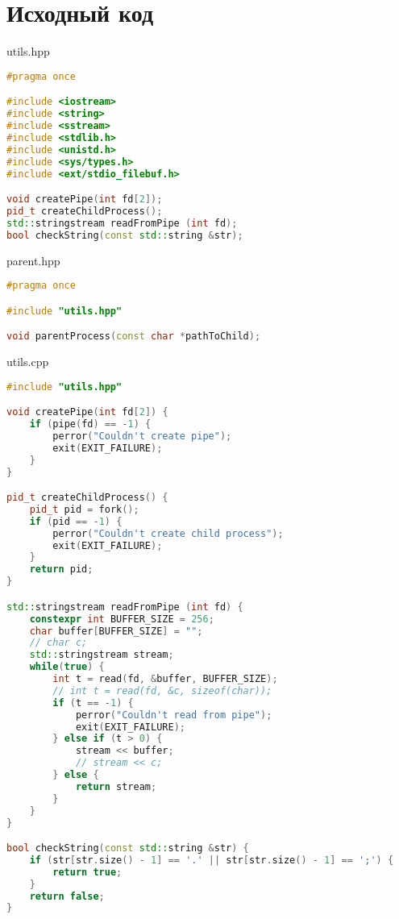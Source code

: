 \documentclass[a4paper, 12pt]{article}
\begin{document}
\newpage

\section{Исходный код}
utils.hpp
\begin{lstlisting}[language=C++]
#pragma once

#include <iostream>
#include <string>
#include <sstream>
#include <stdlib.h>
#include <unistd.h>
#include <sys/types.h>
#include <ext/stdio_filebuf.h>

void createPipe(int fd[2]);
pid_t createChildProcess();
std::stringstream readFromPipe (int fd);
bool checkString(const std::string &str);
\end{lstlisting}

parent.hpp
\begin{lstlisting}[language=C++]
#pragma once

#include "utils.hpp"

void parentProcess(const char *pathToChild);
\end{lstlisting}

utils.cpp
\begin{lstlisting}[language=C++]
#include "utils.hpp"

void createPipe(int fd[2]) {
    if (pipe(fd) == -1) {
        perror("Couldn't create pipe");
        exit(EXIT_FAILURE);
    }
}

pid_t createChildProcess() {
    pid_t pid = fork();
    if (pid == -1) {
        perror("Couldn't create child process");
        exit(EXIT_FAILURE);
    }
    return pid;
}

std::stringstream readFromPipe (int fd) {
    constexpr int BUFFER_SIZE = 256;
    char buffer[BUFFER_SIZE] = "";
    // char c;
    std::stringstream stream;
    while(true) {       
        int t = read(fd, &buffer, BUFFER_SIZE);
        // int t = read(fd, &c, sizeof(char)); 
        if (t == -1) {
            perror("Couldn't read from pipe");
            exit(EXIT_FAILURE);
        } else if (t > 0) {
            stream << buffer;    
            // stream << c;
        } else {
            return stream;
        }
    }
}

bool checkString(const std::string &str) {
    if (str[str.size() - 1] == '.' || str[str.size() - 1] == ';') {
        return true;
    }
    return false;
}
\end{lstlisting}
\end{document}
